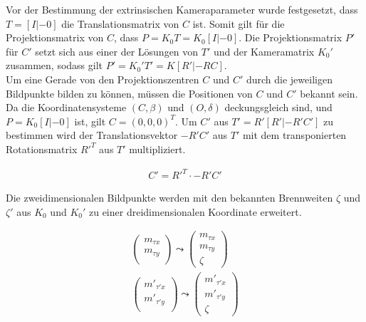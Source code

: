 Vor der Bestimmung der extrinsischen Kameraparameter wurde festgesetzt, dass $T = [I|-0]$ die Translationsmatrix von $C$ ist. Somit gilt für die Projektionsmatrix von $C$, dass $P= K_0T =K_0[I|-0]$. Die Projektionsmatrix $P'$ für $C'$ setzt sich aus einer der Lösungen von $T'$ und der Kameramatrix $K_0'$ zusammen, sodass gilt $P'=K_0'T' = K[R'|-RC]$.\\

Um eine Gerade von den Projektionszentren $C$ und $C'$ durch die jeweiligen Bildpunkte bilden zu können, müssen die Positionen von $C$ und $C'$ bekannt sein. Da die Koordinatensysteme $(C,\beta)$ und $(O,\delta)$ deckungsgleich sind, und $P = K_0[I|-0]$ ist, gilt $C = (0,0,0)^T$.  Um $C'$ aus $T' = R'[R'|-R'C']$ zu bestimmen wird der Translationsvektor $-R'C'$ aus $T'$ mit dem transponierten Rotationsmatrix $R'^T$ aus $T'$ multipliziert.

\begin{gather}
	C' =  R'^T \cdot -R'C' 
\end{gather}

%

Die zweidimensionalen Bildpunkte werden mit den bekannten Brennweiten $\zeta$ und $\zeta'$ aus $K_0$ und $K_0'$ zu einer dreidimensionalen Koordinate erweitert.

\begin{gather}
	\begin{pmatrix}
	m_{\tau x}\\
	m_{\tau y}\\
	\end{pmatrix} \leadsto 
		\begin{pmatrix}
	m_{\tau x} \\
	m_{\tau y}\\
	\zeta
	\end{pmatrix}\\
		\begin{pmatrix}
	m'_{\tau' x}\\
	m'_{\tau' y}\\
	\end{pmatrix} \leadsto 
	\begin{pmatrix}
	m'_{\tau' x} \\
	m'_{\tau' y}\\
	\zeta
	\end{pmatrix}	
\end{gather}

